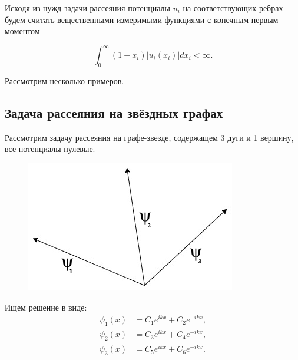 \documentclass[a4 paper, 12 pt]{extarticle}
\begin{document}
  Исходя из нужд задачи рассеяния потенциалы $u_i$ на
  соответствующих ребрах будем считать вещественными измеримыми
  функциями с конечным первым моментом
  
  \begin{equation}
  \int_0^\infty(1+x_i)|u_i(x_i)|dx_i<\infty.
  \end{equation}
  
  Рассмотрим несколько примеров.
  
  \subsection{Задача рассеяния на звёздных графах}
  Рассмотрим задачу рассеяния на графе-звезде, содержащем 3 дуги и 1 вершину, все потенциалы нулевые.
  \begin{figure}[!htb]
  	\centering
  	\includegraphics[scale=0.5]{star.jpg}
  \end{figure}
  Ищем решение в виде:
  \[\begin{split}
  \psi_1\left(x\right) &= C_1 e^{ikx} + C_2 e^{-ikx}, \\
  \psi_2\left(x\right) &= C_3 e^{ikx} + C_4 e^{-ikx}, \\
  \psi_3\left(x\right) &= C_5 e^{ikx} + C_6 e^{-ikx}.
  \end{split}\]
  
\end{document}
